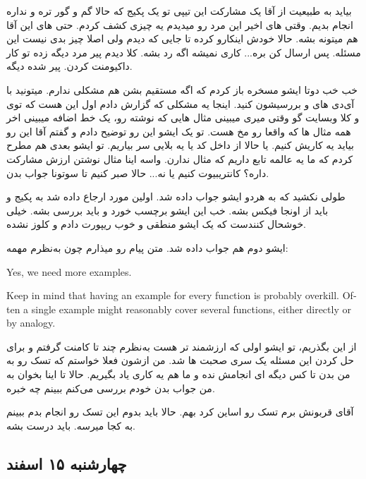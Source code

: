 بیاید به طبیعیت از آقا  یک مشارکت این تیپی تو یک پکیج که حالا گم و گور تره و نداره انجام بدیم. وقتی \cl های اخیر این مرد رو میدیدم یه چیزی
کشف کردم. حتی \cl های این آقا هم میتونه  بشه. حالا خودش اینکارو کرده تا جایی که دیدم ولی اصلا چیز بدی نیست این مسئله.
پس ارسال کن بره... کاری نمیشه اگه رد بشه. کلا دیدم پیر مرد دیگه زده تو کار داکیومنت کردن. پیر شده دیگه.

خب خب دوتا ایشو مسخره باز کردم که اگه مستقیم  بشن هم مشکلی ندارم. میتونید با آی‌دی های  و  بررسیشون کنید.
اینجا یه مشکلی که گزارش دادم اول این هست که توی  و کلا وبسایت گو وقتی میری میبینی مثال هایی که نوشته رو، یک خط اضافه میبینی
اخر همه مثال ها که واقعا رو مخ هست. تو یک ایشو این رو توضیح دادم و گفتم آقا این رو بیاید یه کاریش کنیم. یا حالا از داخل کد یا یه بلایی سر 
بیاریم. تو ایشو بعدی هم مطرح کردم که ما یه عالمه تابع داریم که مثال ندارن. واسه اینا مثال نوشتن ارزش مشارکت داره؟ کانتریبیوت کنیم یا نه...
حالا صبر کنیم تا سوتونا جواب بدن.

طولی نکشید که به هردو ایشو جواب داده شد. اولین مورد ارجاع داده شد به پکیج  و باید از اونجا فیکس بشه.
خب این ایشو برچسب  خورد و باید بررسی بشه. خیلی خوشحال کنندست که یک ایشو منطقی و خوب ریپورت دادم و کلوز نشده.

ایشو دوم هم جواب داده شد. متن پیام رو میذارم چون به‌نظرم مهمه:

\begin{latin}
Yes, we need more examples.

Keep in mind that having an example for every function is probably overkill.
Often a single example might reasonably cover several functions, either directly or by analogy.
\end{latin}

از این بگذریم، تو ایشو اولی که ارزشمند تر هست به‌نظرم چند تا کامنت گرفتم و برای حل کردن این مسئله یک سری صحبت ها شد. من ازشون فعلا
خواستم که تسک رو به من بدن تا کس دیگه ای انجامش نده و ما هم یه کاری یاد بگیریم. حالا تا اینا بخوان به من جواب بدن خودم بررسی می‌کنم ببینم
چه خبره.

آقای  قربونش برم تسک رو اساین کرد بهم. حالا باید بدوم این تسک رو انجام بدم ببینم به کجا میرسه. باید درست بشه.

\subsection{چهارشنبه ۱۵ اسفند}

